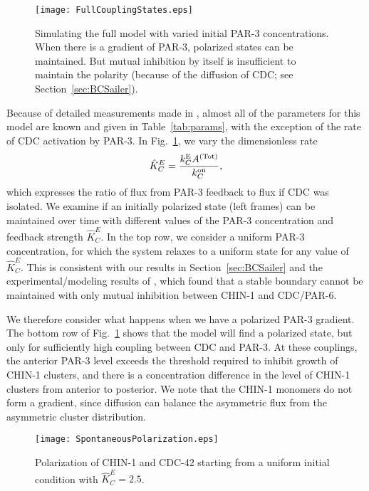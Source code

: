 \documentclass[11pt]{article}
\newcommand{\6}[1]{#1_{\text{6}}}
\newcommand{\3}[1]{#1_{\text{3}}}
\newcommand{\Tot}[1]{#1^\text{(Tot)}}
\newcommand{\C}[1]{#1_C}
\begin{document}
\begin{figure}
\centering
\texttt{[image: FullCouplingStates.eps]}
\caption{\label{fig:FullModel}Simulating the full model with varied initial PAR-3 concentrations. When there is a gradient of PAR-3, polarized states can be maintained. But mutual inhibition by itself is insufficient to maintain the polarity (because of the diffusion of CDC; see Section\ \ref{sec:BCSailer}).}
\end{figure}

Because of detailed measurements made in \cite{sailer2015dynamic}, almost all of the parameters for this model are known and given in Table\ \ref{tab:params}, with the exception of the rate of CDC activation by PAR-3. In Fig.\ \ref{fig:FullModel}, we vary the dimensionless rate
\begin{equation*}
\C{\hat{K}}^E = \frac{\C{\kE} \Tot{A}}{\C{\kon}},
\end{equation*}
which expresses the ratio of flux from PAR-3 feedback to flux if CDC was isolated. We examine if an initially polarized state (left frames) can be maintained over time with different values of the PAR-3 concentration and feedback strength $\C{\hat{K}}^E$. In the top row, we consider a uniform PAR-3 concentration, for which the system relaxes to a uniform state for any value of $\C{\hat{K}}^E$. This is consistent with our results in Section\ \ref{sec:BCSailer} and the experimental/modeling results of \cite{sailer2015dynamic}, which found that a stable boundary cannot be maintained with only mutual inhibition between CHIN-1 and CDC/PAR-6.

We therefore consider what happens when we have a polarized PAR-3 gradient. The bottom row of Fig.\ \ref{fig:FullModel} shows that the model will find a polarized state, but only for sufficiently high coupling between CDC and PAR-3. At these couplings, the anterior PAR-3 level exceeds the threshold required to inhibit growth of CHIN-1 clusters, and there is a concentration difference in the level of CHIN-1 clusters from anterior to posterior. We note that the CHIN-1 monomers do not form a gradient, since diffusion can balance the asymmetric flux from the asymmetric cluster distribution.

\begin{figure}
\centering
\texttt{[image: SpontaneousPolarization.eps]}
\caption{\label{fig:FullModelSP}Polarization of CHIN-1 and CDC-42 starting from a uniform initial condition with $\C{\hat{K}}^E =2.5$.}
\end{figure}
\end{document}

